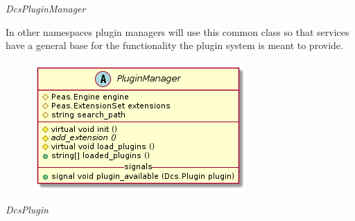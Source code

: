       \emph{DcsPluginManager}

      \vspace*{-0.75cm}
      \begin{minipage}[t]{0.5\textwidth}
      	\vspace*{0.5cm}
        In other namespaces plugin managers will use this common class so that
        services have a general base for the functionality the plugin system is
        meant to provide.
      \end{minipage} \hfill
      \begin{minipage}[t]{0.45\textwidth}
        \begin{figure}[H]
          \includegraphics[width=\textwidth]{figures/design/class/core/plugin-manager}
          \label{fig:dsg-classes-plugin-manager}
        \end{figure}
      \end{minipage}

      \emph{DcsPlugin}

